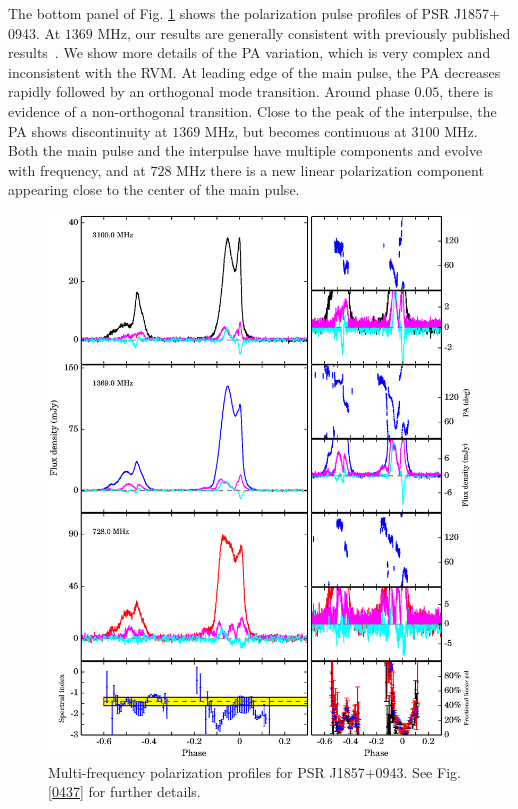 \documentclass[useAMS,usenatbib]{mn2e}
\begin{document}
The bottom panel of Fig. \ref{1857} shows the polarization pulse profiles of 
PSR J1857$+$0943.
%
At $1369$ MHz, our results are generally consistent with previously published 
results~\citep{Yan11}.
%
We show more details of the PA variation, which is very complex and inconsistent
with the RVM.
%
At leading edge of the main pulse, the PA decreases rapidly followed by an 
orthogonal mode transition. 
%
Around phase $0.05$, there is evidence of a non-orthogonal transition.
%
Close to the peak of the interpulse, the PA shows discontinuity at $1369$ MHz, 
but becomes continuous at $3100$ MHz.
%
Both the main pulse and the interpulse have multiple components and evolve 
with frequency, and at $728$ MHz there is a new linear polarization component 
appearing close to the center of the main pulse.

\begin{figure}
\begin{center}
\includegraphics[width=6 in]{1857.ps}
\caption{Multi-frequency polarization profiles for PSR J1857$+$0943. 
See Fig. \ref{0437} for further details.}
\label{1857}
\end{center}
\end{figure}
\end{document}
